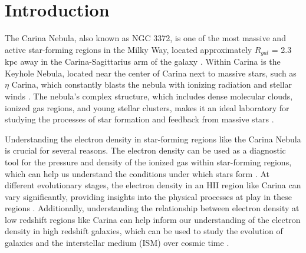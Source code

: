 \section{Introduction}
The Carina Nebula, also known as NGC 3372, is one of the most massive and active star-forming regions in the Milky Way, located approximately $R_{gal}$ = 2.3 kpc away in the Carina-Sagittarius arm of the galaxy \parencite{smith2006census}.
Within Carina is the Keyhole Nebula, located near the center of Carina next to massive stars, such as $\eta$ Carina, which constantly blasts the nebula with ionizing radiation and stellar winds \parencite{brooks2005simba}.
The nebula's complex structure, which includes dense molecular clouds, ionized gas regions, and young stellar clusters, makes it an ideal laboratory for studying the processes of star formation and feedback from massive stars \parencite{smith2007census}.

Understanding the electron density in star-forming regions like the Carina Nebula is crucial for several reasons. 
The electron density can be used as a diagnostic tool for the pressure and density of the ionized gas within star-forming regions, which can help us understand the conditions under which stars form \parencite{kaasinen2016cosmos}.
At different evolutionary stages, the electron density in an HII region like Carina can vary significantly, providing insights into the physical processes at play in these regions \parencite{goldsmith2024electron}.
Additionally, understanding the relationship between electron density at low redshift regions like Carina can help inform our understanding of the electron density in high redshift galaxies, which can be used to study the evolution of galaxies and the interstellar medium (ISM) over cosmic time \parencite{shirazi2014stars}.

